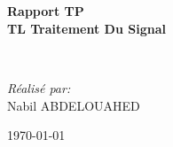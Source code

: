\begin{titlepage}
\begin{center}




\textsc{\Large }\\[0.5cm]

\HRule \\[0.4cm]

{\huge \bfseries Rapport TP \\[0.4cm]
TL Traitement Du Signal \\[0.4cm] }

\HRule \\[4cm]

\begin{minipage}{0.7\textwidth}
  \begin{center} %
    \LARGE
    \emph{Réalisé par:}\\
    Nabil \textsc{ABDELOUAHED}\\
  \end{center}
\end{minipage}
\begin{minipage}{0.4\textwidth}
  \begin{flushright} \large
  \end{flushright}
\end{minipage}
\vfill



{\large \today}

\end{center}
\end{titlepage}